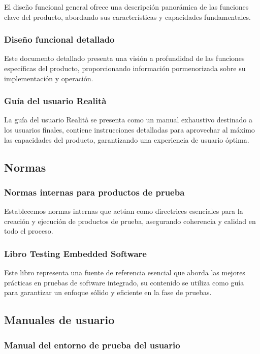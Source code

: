 \documentclass[12pt,a4paper, twoside]{article} %
\begin{document}
El diseño funcional general ofrece una descripción panorámica de las funciones clave del producto, abordando sus características y capacidades fundamentales.

\subsubsection{Diseño funcional detallado}

Este documento detallado presenta una visión a profundidad de las funciones específicas del producto, proporcionando información pormenorizada sobre su implementación y operación.

\subsubsection{Guía del usuario Realità}

La guía del usuario Realità se presenta como un manual exhaustivo destinado a los usuarios finales, contiene instrucciones detalladas para aprovechar al máximo las capacidades del producto, garantizando una experiencia de usuario óptima.

\subsection{Normas}
\subsubsection{Normas internas para productos de prueba}

Establecemos normas internas que actúan como directrices esenciales para la creación y ejecución de productos de prueba, asegurando coherencia y calidad en todo el proceso.

\subsubsection{Libro Testing Embedded Software}

Este libro representa una fuente de referencia esencial que aborda las mejores prácticas en pruebas de software integrado, su contenido se utiliza como guía para garantizar un enfoque sólido y eficiente en la fase de pruebas.

\subsection{Manuales de usuario}
\subsubsection{Manual del entorno de prueba del usuario}
\end{document}
